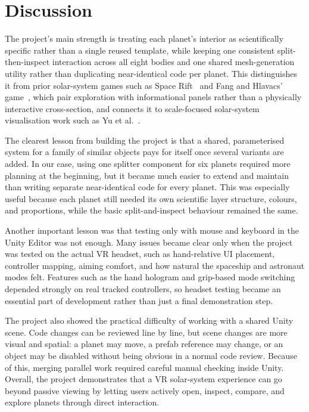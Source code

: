 \documentclass[journal]{vgtc}
\begin{document}
\section{Discussion}

The project's main strength is treating each planet's interior as scientifically specific rather than a single reused template, while keeping one consistent split-then-inspect interaction across all eight bodies and one shared mesh-generation utility rather than duplicating near-identical code per planet. This distinguishes it from prior solar-system games such as Space Rift~\cite{pena} and Fang and Hlavacs' game~\cite{fang}, which pair exploration with informational panels rather than a physically interactive cross-section, and connects it to scale-focused solar-system visualisation work such as Yu et al.~\cite{yu2017}.

The clearest lesson from building the project is that a shared, parameterised system for a family of similar objects pays for itself once several variants are added. In our case, using one splitter component for six planets required more planning at the beginning, but it became much easier to extend and maintain than writing separate near-identical code for every planet. This was especially useful because each planet still needed its own scientific layer structure, colours, and proportions, while the basic split-and-inspect behaviour remained the same.

Another important lesson was that testing only with mouse and keyboard in the Unity Editor was not enough. Many issues became clear only when the project was tested on the actual VR headset, such as hand-relative UI placement, controller mapping, aiming comfort, and how natural the spaceship and astronaut modes felt. Features such as the hand hologram and grip-based mode switching depended strongly on real tracked controllers, so headset testing became an essential part of development rather than just a final demonstration step.

The project also showed the practical difficulty of working with a shared Unity scene. Code changes can be reviewed line by line, but scene changes are more visual and spatial: a planet may move, a prefab reference may change, or an object may be disabled without being obvious in a normal code review. Because of this, merging parallel work required careful manual checking inside Unity. Overall, the project demonstrates that a VR solar-system experience can go beyond passive viewing by letting users actively open, inspect, compare, and explore planets through direct interaction.
\end{document}
